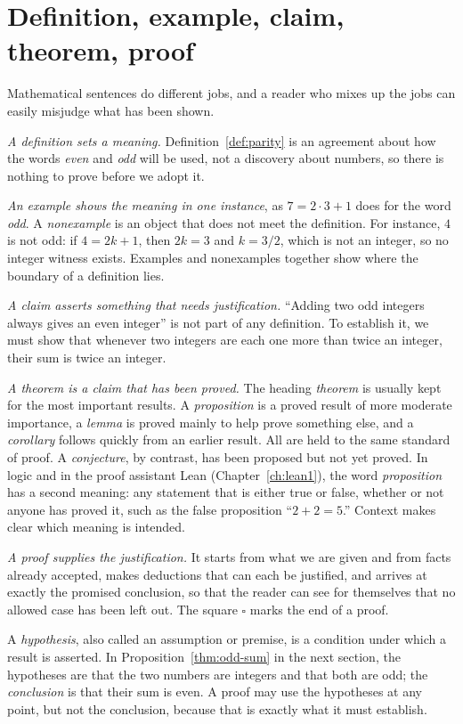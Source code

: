 \section{Definition, example, claim, theorem, proof}\label{ch01:sec:roles}
Mathematical sentences do different jobs, and a reader who mixes up the jobs can easily misjudge what has been shown.

\emph{A definition sets a meaning.} Definition~\ref{def:parity} is an agreement about how the words \emph{even} and \emph{odd} will be used, not a discovery about numbers, so there is nothing to prove before we adopt it.

\emph{An example shows the meaning in one instance}, as $7=2\cdot3+1$ does for the word \emph{odd}. A \emph{nonexample} is an object that does not meet the definition. For instance, $4$ is not odd: if $4=2k+1$, then $2k=3$ and $k=3/2$, which is not an integer, so no integer witness exists. Examples and nonexamples together show where the boundary of a definition lies.

\emph{A claim asserts something that needs justification.} ``Adding two odd integers always gives an even integer'' is not part of any definition. To establish it, we must show that whenever two integers are each one more than twice an integer, their sum is twice an integer.

\emph{A theorem is a claim that has been proved.} The heading \emph{theorem} is usually kept for the most important results. A \emph{proposition} is a proved result of more moderate importance, a \emph{lemma} is proved mainly to help prove something else, and a \emph{corollary} follows quickly from an earlier result. All are held to the same standard of proof. A \emph{conjecture}, by contrast, has been proposed but not yet proved. In logic and in the proof assistant Lean (Chapter~\ref{ch:lean1}), the word \emph{proposition} has a second meaning: any statement that is either true or false, whether or not anyone has proved it, such as the false proposition ``$2+2=5$.'' Context makes clear which meaning is intended.

\emph{A proof supplies the justification.} It starts from what we are given and from facts already accepted, makes deductions that can each be justified, and arrives at exactly the promised conclusion, so that the reader can see for themselves that no allowed case has been left out. The square $\square$ marks the end of a proof.

A \emph{hypothesis}, also called an assumption or premise, is a condition under which a result is asserted. In Proposition~\ref{thm:odd-sum} in the next section, the hypotheses are that the two numbers are integers and that both are odd; the \emph{conclusion} is that their sum is even. A proof may use the hypotheses at any point, but not the conclusion, because that is exactly what it must establish.

